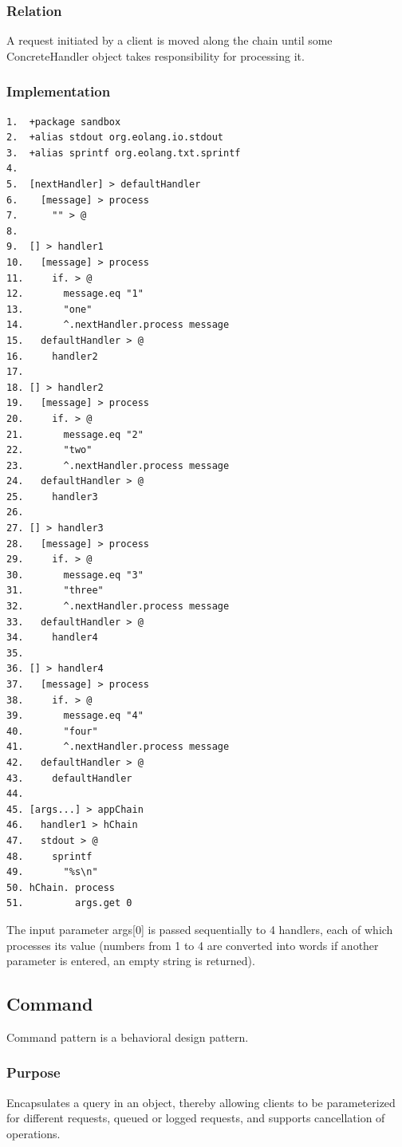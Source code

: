 \documentclass[sigplan,12pt,nonacm=true,review=false]{acmart}
\begin{document}
\subsubsection{Relation}
A request initiated by a client is moved along the chain until some ConcreteHandler object takes responsibility for processing it.

\subsubsection{Implementation}
\begin{verbatim}
1.	+package sandbox
2.	+alias stdout org.eolang.io.stdout
3.	+alias sprintf org.eolang.txt.sprintf
4.	
5.	[nextHandler] > defaultHandler
6.	  [message] > process
7.	    "" > @
8.	
9.	[] > handler1
10.	  [message] > process
11.	    if. > @
12.	      message.eq "1"
13.	      "one"
14.	      ^.nextHandler.process message
15.	  defaultHandler > @
16.	    handler2
17.	
18.	[] > handler2
19.	  [message] > process
20.	    if. > @
21.	      message.eq "2"
22.	      "two"
23.	      ^.nextHandler.process message
24.	  defaultHandler > @
25.	    handler3
26.	
27.	[] > handler3
28.	  [message] > process
29.	    if. > @
30.	      message.eq "3"
31.	      "three"
32.	      ^.nextHandler.process message
33.	  defaultHandler > @
34.	    handler4
35.	
36.	[] > handler4
37.	  [message] > process
38.	    if. > @
39.	      message.eq "4"
40.	      "four"
41.	      ^.nextHandler.process message
42.	  defaultHandler > @
43.	    defaultHandler
44.	
45.	[args...] > appChain
46.	  handler1 > hChain
47.	  stdout > @
48.	    sprintf
49.	      "%s\n"
50.	hChain. process
51.	        args.get 0 

\end{verbatim}


The input parameter args[0] is passed sequentially to 4 handlers, each of which processes its value (numbers from 1 to 4 are converted into words if another parameter is entered, an empty string is returned).

\subsection{Command}
Command pattern is a behavioral design pattern.

\subsubsection{Purpose}
Encapsulates a query in an object, thereby allowing clients to be parameterized  for different requests, queued or logged requests, and supports cancellation of operations.
\end{document}
